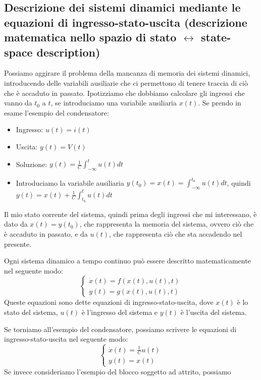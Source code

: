 \subsection{Descrizione dei sistemi dinamici mediante le equazioni di ingresso-stato-uscita (descrizione matematica nello spazio di stato $\leftrightarrow$ state-space description)}
Possiamo aggirare il problema della mancanza di memoria dei sistemi dinamici,
introducendo delle variabili ausiliarie che ci permettono di tenere traccia di
ciò che è accaduto in passato. Ipotizziamo che dobbiamo calcolare gli ingressi
che vanno da $t_0$ a $t$, se introduciamo una variabile ausiliaria $x(t)$. Se
prendo in esame l'esempio del condensatore:
\begin{itemize}
    \item Ingresso: $u(t) = i(t)$
    \item Uscita: $y(t) = V(t)$
    \item Soluzione: $y(t) = \frac{1}{C} \int_{-\infty}^{t} u(t) dt$
    \item Introduciamo la variabile ausiliaria $y(t_0)= x(t) = \int_{-\infty}^{t_0} u(t)
              dt$, quindi $y(t) = x(t) + \frac{1}{C} \int_{t_0}^{t} u(t) dt$
\end{itemize}
Il mio stato corrente del sistema, quindi prima degli ingressi che mi interessano, è dato da $x(t) = y(t_0)$, che rappresenta la memoria del sistema, ovvero ciò che è accaduto in passato, e da $u(t)$, che rappresenta ciò che sta accadendo nel presente.
\begin{tcolorbox}[colback=yellow!10, colframe=black]
    Ogni sistema dinamico a tempo continuo può essere descritto matematicamente nel seguente modo:
    \[
        \begin{cases}
            \dot{x}(t) = f(x(t), u(t), t) \\
            y(t) = g(x(t), u(t), t)
        \end{cases}
    \]
    Queste equazioni sono dette equazioni di ingresso-stato-uscita, dove $x(t)$ è
    lo stato del sistema, $u(t)$ è l'ingresso del sistema e $y(t)$ è l'uscita del
    sistema.
\end{tcolorbox}
Se torniamo all'esempio del condensatore, possiamo scrivere le equazioni di ingresso-stato-uscita nel seguente modo:
\[
    \begin{cases}
        \dot{x}(t) = \frac{1}{C}u(t) \\
        y(t) = x(t)
    \end{cases}
\]
Se invece consideriamo l'esempio del blocco soggetto ad attrito, possiamo

